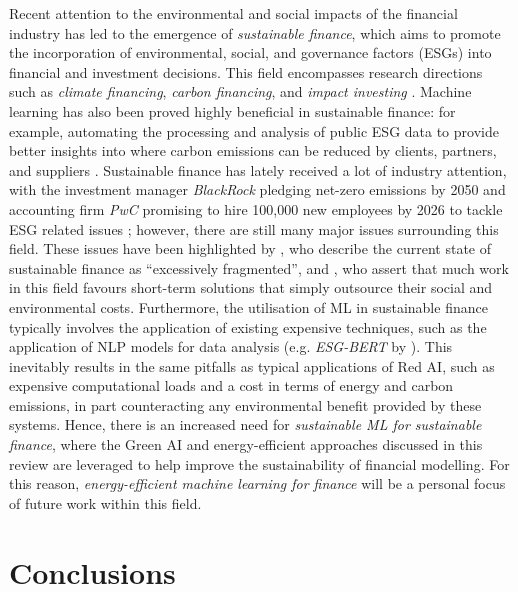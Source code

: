 \documentclass[a4paper, 12pt]{article}
\begin{document}
    Recent attention to the environmental and social impacts of the financial industry has led to the emergence of \emph{sustainable finance}, which aims to promote the incorporation of environmental, social, and governance factors (ESGs) into financial and investment decisions. This field encompasses research directions such as \emph{climate financing}, \emph{carbon financing}, and \emph{impact investing} \citep{kumar-2022}. Machine learning has also been proved highly beneficial in sustainable finance: for example, automating the processing and analysis of public ESG data to provide better insights into where carbon emissions can be reduced by clients, partners, and suppliers \citep{esg-global-survey}. Sustainable finance has lately received a lot of industry attention, with the investment manager \emph{BlackRock} pledging net-zero emissions by 2050 \citep{blackrock-report} and accounting firm \emph{PwC} promising to hire 100,000 new employees by 2026 to tackle ESG related issues \citep{reuters-article}; however, there are still many major issues surrounding this field. These issues have been highlighted by \citet{cunha-2021}, who describe the current state of sustainable finance as ``excessively fragmented”, and \citet{fatemi-fooladi-2013}, who assert that much work in this field favours short-term solutions that simply outsource their social and environmental costs. Furthermore, the utilisation of ML in sustainable finance typically involves the application of existing expensive techniques, such as the application of NLP models for data analysis (e.g. \emph{ESG-BERT} by \citet{mehra-2022}). This inevitably results in the same pitfalls as typical applications of Red AI, such as expensive computational loads and a cost in terms of energy and carbon emissions, in part counteracting any environmental benefit provided by these systems. Hence, there is an increased need for \emph{sustainable ML for sustainable finance}, where the Green AI and energy-efficient approaches discussed in this review are leveraged to help improve the sustainability of financial modelling. For this reason, \emph{energy-efficient machine learning for finance} will be a personal focus of future work within this field.


    \section{Conclusions}
\end{document}
